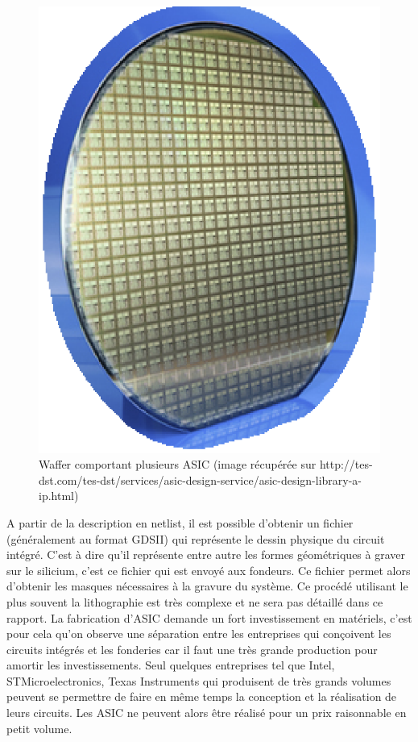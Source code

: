 \begin{figure}[hb]
\begin{center}
\includegraphics[scale=0.4]{asic.eps}
\end{center}
\caption{Waffer comportant plusieurs ASIC (image récupérée sur http://tes-dst.com/tes-dst/services/asic-design-service/asic-design-library-a-ip.html)}
\end{figure}

A partir de la description en netlist, il est possible d'obtenir un fichier
(généralement au format GDSII) qui représente le dessin physique du circuit intégré.
C'est à dire qu'il représente entre autre les formes géométriques à graver sur le
silicium, c'est ce fichier qui est envoyé aux fondeurs. Ce fichier permet alors
d'obtenir les masques nécessaires à la gravure du système. Ce procédé utilisant le
plus souvent la lithographie est très complexe et ne sera pas détaillé dans ce
rapport. La fabrication d'ASIC demande un fort investissement en matériels, c'est
pour cela qu'on observe une séparation entre les entreprises qui conçoivent les
circuits intégrés et les fonderies car il faut une très grande production pour
amortir les investissements. Seul quelques entreprises tel que Intel,
STMicroelectronics, Texas Instruments qui produisent de très grands volumes peuvent
se permettre de faire en même temps la conception et la réalisation de leurs
circuits. Les ASIC ne peuvent alors être réalisé pour un prix raisonnable en petit
volume.


